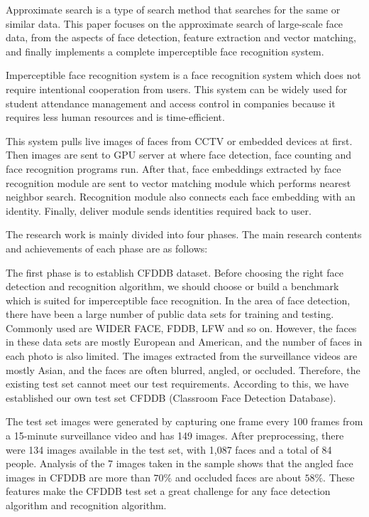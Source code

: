 \begin{bigabstract}
	
Approximate search is a type of search method that searches for the same or similar data. This paper focuses on the approximate search of large-scale face data, from the aspects of face detection, feature extraction and vector matching, and finally implements a complete imperceptible face recognition system.

Imperceptible face recognition system is a face recognition system which does not require intentional cooperation from users. This system can be widely used for student attendance management and access control in companies because it requires less human resources and is time-efficient. 

This system pulls live images of faces from CCTV or embedded devices at first. Then images are sent to GPU server at where face detection, face counting and face recognition programs run. After that, face embeddings extracted by face recognition module are sent to vector matching module which performs nearest neighbor search. Recognition module also connects each face embedding with an identity. Finally, deliver module sends identities required back to user.

The research work is mainly divided into four phases. The main research contents and achievements of each phase are as follows:

The first phase is to establish CFDDB dataset. Before choosing the right face detection and recognition algorithm, we should choose or build a benchmark which is suited for imperceptible face recognition. In the area of face detection, there have been a large number of public data sets for training and testing. Commonly used are WIDER FACE\cite{yang2016wider}, FDDB\cite{fddbTech}, LFW\cite{huang2007labeled} and so on. However, the faces in these data sets are mostly European and American, and the number of faces in each photo is also limited. The images extracted from the surveillance videos are mostly Asian, and the faces are often blurred, angled, or occluded. Therefore, the existing test set cannot meet our test requirements. According to this, we have established our own test set CFDDB (Classroom Face Detection Database).

The test set images were generated by capturing one frame every 100 frames from a 15-minute surveillance video and has 149 images. After preprocessing, there were 134 images available in the test set, with 1,087 faces and a total of 84 people. Analysis of the 7 images taken in the sample shows that the angled face images in CFDDB are more than $70\%$ and occluded faces are about $58\%$. These features make the CFDDB test set a great challenge for any face detection algorithm and recognition algorithm.


\end{bigabstract}
